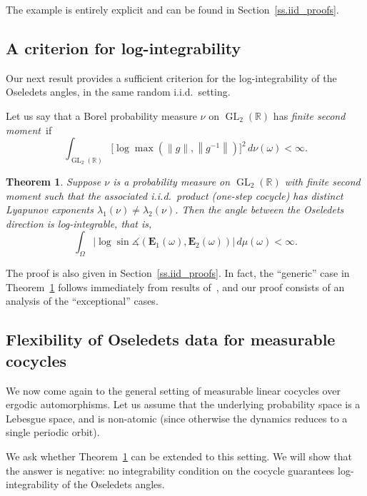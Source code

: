 \documentclass[10pt]{amsart}
\newtheorem{theo}{Theorem}[section]
\theoremstyle{definition}\newtheorem{defi}[theo]{Definition}\newtheorem{rema}[theo]{Remark}\newtheorem{exam}[theo]{Example}\newtheorem{exem}[theo]{Example}\newtheorem{nota}[theo]{Notation}
\newcommand{\R}{\mathbb{R}}
\newcommand{\E}{\mathbf{E}}
\DeclareMathOperator{\GL}{GL}
\renewcommand{\angle}{\measuredangle}
\begin{document}
The example is entirely explicit and can be found in Section~\ref{ss.iid_proofs}.

\subsection{A criterion for log-integrability}

Our next result provides a sufficient criterion for the log-integrability of the Oseledets angles, in the same random i.i.d.~setting.

Let us say that a Borel probability measure $\nu$ on $\GL_2(\R)$ has \emph{finite second moment}~if
\begin{equation}
\int_{\GL_2(\R)} \bigl[\log \max \left(\|g\|, \left\|g^{-1}\right\|\right) \bigr]^2 \, d\nu(\omega) < \infty.
\end{equation}

\begin{theo}\label{t.integrable}
Suppose $\nu$ is a probability measure on $\GL_2(\R)$ with finite second moment such that the associated i.i.d.~product (one-step cocycle) has distinct Lyapunov exponents $\lambda_1(\nu) \neq \lambda_2(\nu)$. Then the angle between the Oseledets direction is log-integrable, that is,
\begin{equation}
\int_{\Omega}\left|\log\sin \angle(\E_1(\omega),\E_2(\omega)) \right|\, d\mu(\omega) < \infty.
\end{equation}
\end{theo}

The proof is also given in Section~\ref{ss.iid_proofs}. In fact, the ``generic'' case in Theorem~\ref{t.integrable} follows immediately from results of~\cite{benoist-quint}, and our proof consists of an analysis of the ``exceptional'' cases.


\subsection{Flexibility of Oseledets data for measurable cocycles}

We now come again to the general setting of measurable linear cocycles over ergodic automorphisms. Let us assume that the underlying probability space is a Lebesgue space, and is non-atomic (since otherwise the dynamics reduces to a single periodic orbit).

We ask whether Theorem~\ref{t.integrable} can be extended to this setting. We will show that the answer is negative: no integrability condition on the cocycle guarantees log-integrability of the Oseledets angles.
\end{document}
